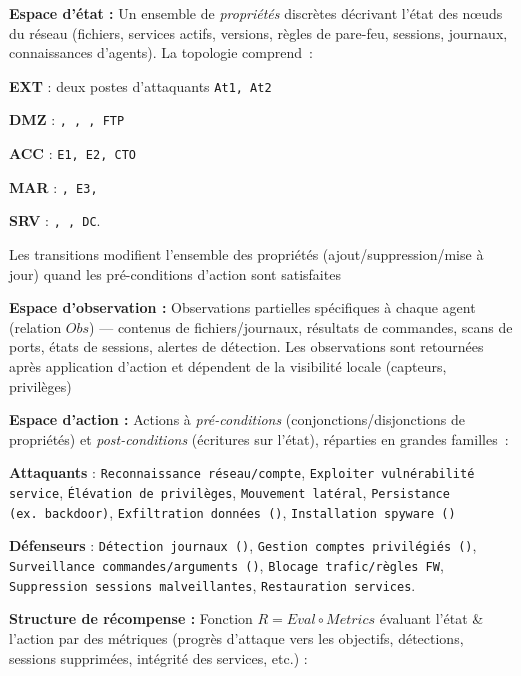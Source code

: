 \begin{enumerate*}[label={\roman*)}, itemjoin={; \quad}]
  \item \textbf{Espace d'état :} Un ensemble de \emph{propriétés} discrètes décrivant l'état des nœuds du réseau (fichiers, services actifs, versions, règles de pare-feu, sessions, journaux, connaissances d'agents). La topologie comprend~:
  \begin{enumerate*}[label={\alph*)}, itemjoin={; \ }]
    \item \textbf{EXT} : deux postes d'attaquants \texttt{At1, At2}
    \item \textbf{DMZ} : \texttt{, , , FTP}
    \item \textbf{ACC} : \texttt{E1, E2, CTO}
    \item \textbf{MAR} : \texttt{, E3, }
    \item \textbf{SRV} : \texttt{, , DC}.
  \end{enumerate*}
  Les transitions modifient l'ensemble des propriétés (ajout/suppression/mise à jour) quand les pré-conditions d'action sont satisfaites
  \item \textbf{Espace d'observation :} Observations partielles spécifiques à chaque agent (relation $Obs$) — contenus de fichiers/journaux, résultats de commandes, scans de ports, états de sessions, alertes de détection. Les observations sont retournées après application d'action et dépendent de la visibilité locale (capteurs, privilèges)
  \item \textbf{Espace d'action :} Actions à \emph{pré-conditions} (conjonctions/disjonctions de propriétés) et \emph{post-conditions} (écritures sur l'état), réparties en grandes familles~:
  \begin{enumerate*}[label={\alph*)}, itemjoin={; \ }]
    \item \textbf{Attaquants} : \texttt{Reconnaissance réseau/compte}, \texttt{Exploiter vulnérabilité service}, \texttt{Élévation de privilèges}, \texttt{Mouvement latéral}, \texttt{Persistance (ex.~backdoor)}, \texttt{Exfiltration données ()}, \texttt{Installation spyware ()}
    \item \textbf{Défenseurs} : \texttt{Détection journaux ()}, \texttt{Gestion comptes privilégiés ()}, \texttt{Surveillance commandes/arguments ()}, \texttt{Blocage trafic/règles FW}, \texttt{Suppression sessions malveillantes}, \texttt{Restauration services}.
  \end{enumerate*}
  \item \textbf{Structure de récompense :} Fonction $R = Eval \circ Metrics$ évaluant l'état \& l'action par des métriques (progrès d'attaque vers les objectifs, détections, sessions supprimées, intégrité des services, etc.) :

\end{enumerate*}

